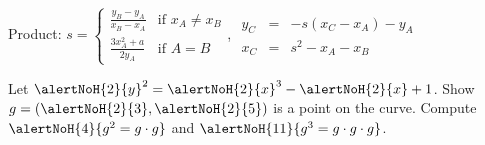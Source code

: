 \begin{frame}
Product: $
s= \left\{ \begin{array}{ll}\displaystyle\frac{y_B-y_A}{x_B-x_A} &\displaystyle\text{if } x_A\neq x_B \\\displaystyle \frac{3x_A^2+a}{2y_A}&\text{if } A=B \end{array} \right.$,   
$\begin{array}{rcl}
y_C &=& -s(x_C-x_A)-y_A\\ 
x_C &=& s^2 - x_A-x_B \end{array}
$
\begin{example}
Let  
$
{\alertNoH{2}{y}}^2 = {\alertNoH{2}{x}}^3-\alertNoH{2}{x}  +1
$. 
Show $g= (\alertNoH{2}{3}, \alertNoH{2}{5}) $ is a point on the curve. Compute $\alertNoH{4}{g^2 = g\cdot g}$ and $\alertNoH{11}{g^3 = g\cdot g\cdot g}$.

\begin{itemize}
\end{itemize}
\end{example}
\end{frame}
